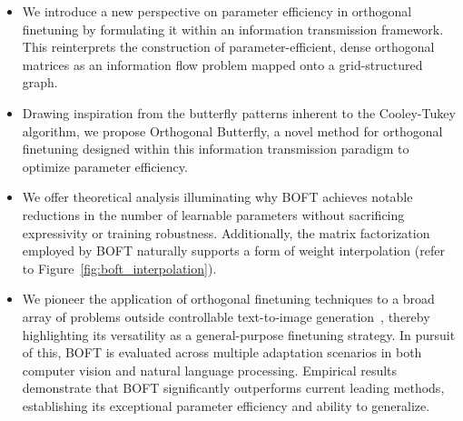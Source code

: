 \begin{itemize}[leftmargin=*,nosep]
    \item We introduce a new perspective on parameter efficiency in orthogonal finetuning by formulating it within an information transmission framework. This reinterprets the construction of parameter-efficient, dense orthogonal matrices as an information flow problem mapped onto a grid-structured graph.
    \item Drawing inspiration from the butterfly patterns inherent to the Cooley-Tukey algorithm, we propose Orthogonal Butterfly, a novel method for orthogonal finetuning designed within this information transmission paradigm to optimize parameter efficiency.
    \item We offer theoretical analysis illuminating why BOFT achieves notable reductions in the number of learnable parameters without sacrificing expressivity or training robustness. Additionally, the matrix factorization employed by BOFT naturally supports a form of weight interpolation (refer to Figure~\ref{fig:boft_interpolation}).
    \item We pioneer the application of orthogonal finetuning techniques to a broad array of problems outside controllable text-to-image generation~\cite{qiu2023controlling}, thereby highlighting its versatility as a general-purpose finetuning strategy. In pursuit of this, BOFT is evaluated across multiple adaptation scenarios in both computer vision and natural language processing. Empirical results demonstrate that BOFT significantly outperforms current leading methods, establishing its exceptional parameter efficiency and ability to generalize.
\end{itemize}

